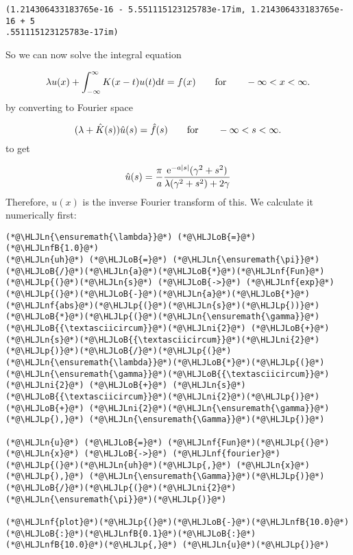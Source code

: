 \documentclass[12pt,a4paper]{article}
\newcommand{\HLJLn}[1]{#1}
\newcommand{\HLJLnf}[1]{\textcolor[RGB]{66,102,213}{#1}}
\newcommand{\HLJLnfB}[1]{\textcolor[RGB]{59,151,46}{#1}}
\newcommand{\HLJLni}[1]{\textcolor[RGB]{59,151,46}{#1}}
\newcommand{\HLJLoB}[1]{\textcolor[RGB]{102,102,102}{\textbf{#1}}}
\newcommand{\HLJLp}[1]{#1}
\def\qqfor{\qquad\hbox{for}\qquad}
\def\D{ {\rm d} }
\def\E{ {\rm e} }
\def\dt{\D t}
\begin{document}
\begin{lstlisting}
(1.214306433183765e-16 - 5.551115123125783e-17im, 1.214306433183765e-16 + 5
.551115123125783e-17im)
\end{lstlisting}


So we can now solve the integral equation

\[
\lambda u(x) + \int_{-\infty}^\infty K(x-t)u(t) \dt = f(x)\qqfor -\infty < x < \infty.
\]
by converting to Fourier space

\[
(\lambda + \hat K(s)) \hat u(s)  = \hat f(s)\qqfor -\infty < s < \infty.
\]
to get

\[
\hat u(s) = {\pi \over a} { \E^{-a |s|} (\gamma^2+s^2) \over \lambda (\gamma^2+s^2) + 2\gamma}
\]
Therefore, $u(x)$ is the inverse Fourier transform of this. We calculate it numerically first:


\begin{lstlisting}
(*@\HLJLn{\ensuremath{\lambda}}@*) (*@\HLJLoB{=}@*) (*@\HLJLnfB{1.0}@*)
(*@\HLJLn{uh}@*) (*@\HLJLoB{=}@*) (*@\HLJLn{\ensuremath{\pi}}@*)(*@\HLJLoB{/}@*)(*@\HLJLn{a}@*)(*@\HLJLoB{*}@*)(*@\HLJLnf{Fun}@*)(*@\HLJLp{(}@*)(*@\HLJLn{s}@*) (*@\HLJLoB{->}@*) (*@\HLJLnf{exp}@*)(*@\HLJLp{(}@*)(*@\HLJLoB{-}@*)(*@\HLJLn{a}@*)(*@\HLJLoB{*}@*)(*@\HLJLnf{abs}@*)(*@\HLJLp{(}@*)(*@\HLJLn{s}@*)(*@\HLJLp{))}@*)(*@\HLJLoB{*}@*)(*@\HLJLp{(}@*)(*@\HLJLn{\ensuremath{\gamma}}@*)(*@\HLJLoB{{\textasciicircum}}@*)(*@\HLJLni{2}@*) (*@\HLJLoB{+}@*) (*@\HLJLn{s}@*)(*@\HLJLoB{{\textasciicircum}}@*)(*@\HLJLni{2}@*)(*@\HLJLp{)}@*)(*@\HLJLoB{/}@*)(*@\HLJLp{(}@*)(*@\HLJLn{\ensuremath{\lambda}}@*)(*@\HLJLoB{*}@*)(*@\HLJLp{(}@*)(*@\HLJLn{\ensuremath{\gamma}}@*)(*@\HLJLoB{{\textasciicircum}}@*)(*@\HLJLni{2}@*) (*@\HLJLoB{+}@*) (*@\HLJLn{s}@*)(*@\HLJLoB{{\textasciicircum}}@*)(*@\HLJLni{2}@*)(*@\HLJLp{)}@*) (*@\HLJLoB{+}@*) (*@\HLJLni{2}@*)(*@\HLJLn{\ensuremath{\gamma}}@*)(*@\HLJLp{),}@*) (*@\HLJLn{\ensuremath{\Gamma}}@*)(*@\HLJLp{)}@*)

(*@\HLJLn{u}@*) (*@\HLJLoB{=}@*) (*@\HLJLnf{Fun}@*)(*@\HLJLp{(}@*)(*@\HLJLn{x}@*) (*@\HLJLoB{->}@*) (*@\HLJLnf{fourier}@*)(*@\HLJLp{(}@*)(*@\HLJLn{uh}@*)(*@\HLJLp{,}@*) (*@\HLJLn{x}@*)(*@\HLJLp{),}@*) (*@\HLJLn{\ensuremath{\Gamma}}@*)(*@\HLJLp{)}@*)(*@\HLJLoB{/}@*)(*@\HLJLp{(}@*)(*@\HLJLni{2}@*)(*@\HLJLn{\ensuremath{\pi}}@*)(*@\HLJLp{)}@*)

(*@\HLJLnf{plot}@*)(*@\HLJLp{(}@*)(*@\HLJLoB{-}@*)(*@\HLJLnfB{10.0}@*)(*@\HLJLoB{:}@*)(*@\HLJLnfB{0.1}@*)(*@\HLJLoB{:}@*)(*@\HLJLnfB{10.0}@*)(*@\HLJLp{,}@*) (*@\HLJLn{u}@*)(*@\HLJLp{)}@*)
\end{lstlisting}
\end{document}
